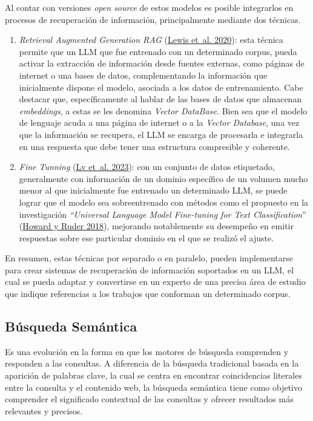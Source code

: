 \documentclass[
  12pt,
  openany]{book}
\begin{document}
Al contar con versiones \emph{open source} de estos modelos es posible integrarlos en procesos de recuperación de información, principalmente mediante dos técnicas.

\begin{enumerate}
\def\labelenumi{\arabic{enumi}.}
\item
  \emph{Retrieval Augmented Generation RAG} (\protect\hyperlink{ref-lewis2020}{Lewis et~al. 2020}): esta técnica permite que un LLM que fue entrenado con un determinado corpus, pueda activar la extracción de información desde fuentes externas, como páginas de internet o una bases de datos, complementando la información que inicialmente dispone el modelo, asociada a los datos de entrenamiento. Cabe destacar que, específicamente al hablar de las bases de datos que almacenan \emph{embeddings}, a estas se les denomina \emph{Vector DataBase.} Bien sea que el modelo de lenguaje acuda a una página de internet o a la \emph{Vector Database}, una vez que la información se recupera, el LLM se encarga de procesarla e integrarla en una respuesta que debe tener una estructura compresible y coherente.
\item
  \emph{Fine Tunning} (\protect\hyperlink{ref-lv2023}{Lv et~al. 2023}): con un conjunto de datos etiquetado, generalmente con información de un dominio específico de un volumen mucho menor al que inicialmente fue entrenado un determinado LLM, se puede lograr que el modelo sea sobreentrenado con métodos como el propuesto en la investigación \emph{``Universal Language Model Fine-tuning for Text Classification}'' (\protect\hyperlink{ref-howard2018}{Howard y Ruder 2018}), mejorando notablemente su desempeño en emitir respuestas sobre ese particular dominio en el que se realizó el ajuste.
\end{enumerate}

En resumen, estas técnicas por separado o en paralelo, pueden implementarse para crear sistemas de recuperación de información soportados en un LLM, el cual se pueda adaptar y convertirse en un experto de una precisa área de estudio que indique referencias a los trabajos que conforman un determinado corpus.

\hypertarget{busquedasemantica}{%
\subsection{Búsqueda Semántica}\label{busquedasemantica}}

Es una evolución en la forma en que los motores de búsqueda comprenden y responden a las consultas. A diferencia de la búsqueda tradicional basada en la aparición de palabras clave, la cual se centra en encontrar coincidencias literales entre la consulta y el contenido web, la búsqueda semántica tiene como objetivo comprender el significado contextual de las consultas y ofrecer resultados más relevantes y precisos.
\end{document}
